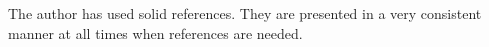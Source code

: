 \documentclass{article}
\begin{document}







The author has used solid references. They are presented in a very consistent manner at all times when references are needed.\\









\end{document}
